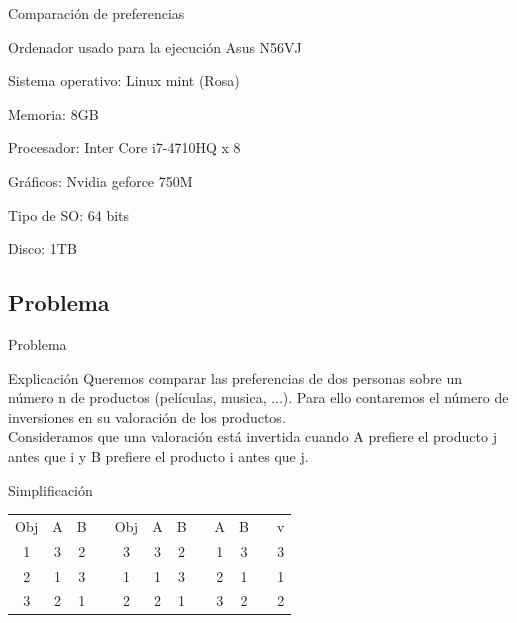 \begin{frame}{Comparación de preferencias}
\begin{alertblock}{Ordenador usado para la ejecuci\'on}
	Asus N56VJ

	Sistema operativo: Linux mint (Rosa)

	Memoria: 8GB

	Procesador: Inter Core i7-4710HQ x 8

	Gráficos: Nvidia geforce 750M

	Tipo de SO: 64 bits

	Disco: 1TB
	\end{alertblock}
\end{frame}

\subsection{Problema}
\begin{frame}{Problema}
	\begin{block}{Explicación}
	Queremos comparar las preferencias de dos personas sobre un número n de productos (películas, musica, ...). Para ello contaremos el número de inversiones en su valoración de los productos.\\
	Consideramos que una valoración está invertida cuando A prefiere el producto j antes que i y B prefiere el producto i antes que j. 
	\end{block}
	
	\begin{block}{Simplificación}
		\begin{table}
		\begin{tabular}{|c|c|c|c|c|c|c|c|c|c|c|c|}
		Obj & A & B & & Obj & A & B & & A & B & & v\\
		1 & 3 & 2 & & 3 & 3 & 2 & & 1 & 3 & & 3\\
		2 & 1 & 3 & & 1 & 1 & 3 & & 2 & 1 & & 1\\
		3 & 2 & 1 & & 2 & 2 & 1 & & 3 & 2 & & 2\\
		\end{tabular}
		\end{table}
	\end{block}
	
\end{frame}

